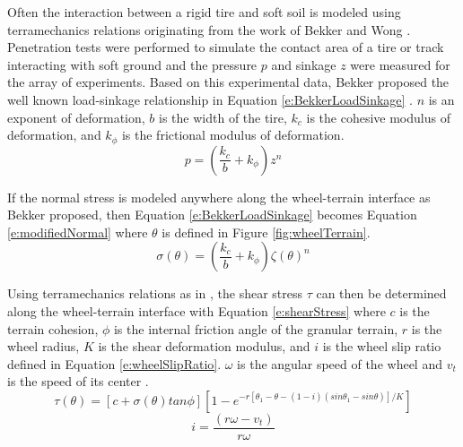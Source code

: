 \documentclass[12pt,onecolumn]{report}
\begin{document}
Often the interaction between a rigid tire and soft soil is modeled using terramechanics relations originating from the work of Bekker and Wong \cite{wong93}. Penetration tests were performed to simulate the contact area of a tire or track interacting with soft ground and the pressure $p$ and sinkage $z$ were measured for the array of experiments. Based on this experimental data, Bekker proposed the well known load-sinkage relationship in Equation \ref{e:BekkerLoadSinkage} \cite{wong93}. $n$ is an exponent of deformation, $b$ is the width of the tire, $k_c$ is the cohesive modulus of deformation, and $k_\phi$ is the frictional modulus of deformation.
%
\begin{equation}\label{e:BekkerLoadSinkage}
p = \left(\frac{k_c}{b} + k_\phi\right)z^n
\end{equation}

If the normal stress is modeled anywhere along the wheel-terrain interface as Bekker proposed, then Equation \ref{e:BekkerLoadSinkage} becomes Equation \ref{e:modifiedNormal} where $\theta$ is defined in Figure \ref{fig:wheelTerrain}.
%
\begin{equation}\label{e:modifiedNormal}
\sigma\left(\theta\right) = \left(\frac{k_c}{b} + k_\phi\right)\zeta\left(\theta\right)^n
\end{equation}

Using terramechanics relations as in \cite{wong93}, the shear stress $\tau$ can then be determined along the wheel-terrain interface with Equation \ref{e:shearStress} where $c$ is the terrain cohesion, $\phi$ is the internal friction angle of the granular terrain, $r$ is the wheel radius, $K$ is the shear deformation modulus, and $i$ is the wheel slip ratio defined in Equation \ref{e:wheelSlipRatio}. $\omega$ is the angular speed of the wheel and $v_t$ is the speed of its center \cite{Ghotbi2016}. 
%
\begin{equation}\label{e:shearStress}
\tau\left(\theta\right) = [c+\sigma\left(\theta\right)tan\phi][1 - e^{-r[\theta_1 - \theta - \left(1-i\right)\left(sin\theta_1 - sin\theta\right)]/K}]
\end{equation}
\begin{equation}\label{e:wheelSlipRatio}
i = \frac{\left(r\omega-v_t \right)}{r \omega}
\end{equation}
\end{document}
